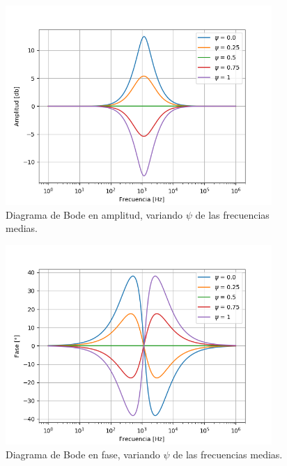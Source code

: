 \documentclass[a4paper]{article}
\begin{document}
\begin{figure}[H]
\centering
	\includegraphics[width=0.9\textwidth]{Imagenes/Medium-psi-bode.png}
	\caption{Diagrama de Bode en amplitud, variando $\psi$ de las frecuencias medias.}
	\label{fig:bode_modulo_med}
\end{figure}
\begin{figure}[H]
\centering
	\includegraphics[width=0.9\textwidth]{Imagenes/Medium-psi-ph.png}
	\caption{Diagrama de Bode en fase, variando $\psi$ de las frecuencias medias.}
	\label{fig:bode_ph_med}
\end{figure}
\end{document}
